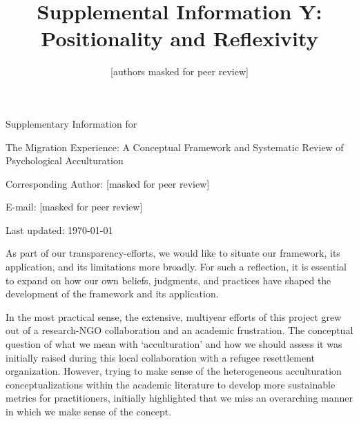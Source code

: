 \documentclass[man, 12pt, a4paper]{apa7}
\title{Supplemental Information Y: Positionality and Reflexivity}
\author{[authors masked for peer review]}
\begin{document}
\begin{titlepage}
	{\noindent\Large Supplementary Information for \par}
	\vspace{0.5cm}
	{\noindent\Large The Migration Experience: A Conceptual Framework and Systematic Review of Psychological Acculturation\par}
	\vspace{1.5cm}
	{\noindent\LARGE\bfseries \thetitle \par}
	\vspace{2cm}
	{\noindent\Large\itshape \theauthor \par}
	\vfill
	\noindent Corresponding Author: [masked for peer review]\par
	\noindent E-mail: [masked for peer review]\par
	\vfill

	{\noindent Last updated: \today\par}
\end{titlepage}

\begin{center}
   \textbf{\thetitle} 
\end{center}

As part of our transparency-efforts, we would like to situate our framework, its application, and its limitations more broadly. For such a reflection, it is essential to expand on how our own beliefs, judgments, and practices have shaped the development of the framework and its application. 

In the most practical sense, the extensive, multiyear efforts of this project grew out of a research-NGO collaboration and an academic frustration. The conceptual question of what we mean with `acculturation' and how we should assess it was initially raised during this local collaboration with a refugee resettlement organization. However, trying to make sense of the heterogeneous acculturation conceptualizations within the academic literature to develop more sustainable metrics for practitioners, initially highlighted that we miss an overarching manner in which we make sense of the concept. 
\end{document}
